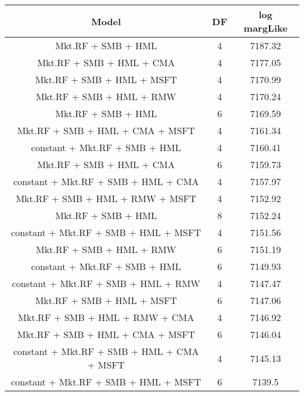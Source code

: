 \begin{tabular}{ccc}
\hline
Model & DF & log margLike \\ 
\hline
Mkt.RF + SMB + HML & 4 & 7187.32 \\ 
Mkt.RF + SMB + HML + CMA & 4 & 7177.05 \\ 
Mkt.RF + SMB + HML + MSFT & 4 & 7170.99 \\ 
Mkt.RF + SMB + HML + RMW & 4 & 7170.24 \\ 
Mkt.RF + SMB + HML & 6 & 7169.59 \\ 
Mkt.RF + SMB + HML + CMA + MSFT & 4 & 7161.34 \\ 
constant + Mkt.RF + SMB + HML & 4 & 7160.41 \\ 
Mkt.RF + SMB + HML + CMA & 6 & 7159.73 \\ 
constant + Mkt.RF + SMB + HML + CMA & 4 & 7157.97 \\ 
Mkt.RF + SMB + HML + RMW + MSFT & 4 & 7152.92 \\ 
Mkt.RF + SMB + HML & 8 & 7152.24 \\ 
constant + Mkt.RF + SMB + HML + MSFT & 4 & 7151.56 \\ 
Mkt.RF + SMB + HML + RMW & 6 & 7151.19 \\ 
constant + Mkt.RF + SMB + HML & 6 & 7149.93 \\ 
constant + Mkt.RF + SMB + HML + RMW & 4 & 7147.47 \\ 
Mkt.RF + SMB + HML + MSFT & 6 & 7147.06 \\ 
Mkt.RF + SMB + HML + RMW + CMA & 4 & 7146.92 \\ 
Mkt.RF + SMB + HML + CMA + MSFT & 6 & 7146.04 \\ 
constant + Mkt.RF + SMB + HML + CMA + MSFT & 4 & 7145.13 \\ 
constant + Mkt.RF + SMB + HML + MSFT & 6 & 7139.5 \\ 
\hline
\end{tabular}
